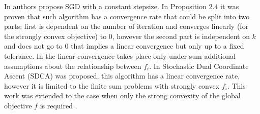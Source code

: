 In \cite{solodov1998incremental, nedic2001convergence} authors propose SGD with a constant stepsize. In Proposition $2.4$ \cite{nedic2001convergence} it was proven that such algorithm has a convergence rate that could be split into two parts: first is dependent on the number of iteration and converges linearly (for the strongly convex objective) to $0$, however the second part is independent on $k$ and does not go to $0$ that implies a linear convergence but only up to a fixed tolerance. In \cite{solodov1998incremental} the linear convergence takes place only under sum additional assumptions about the relationship between $f_i$. In \cite{shalev2013stochastic} Stochastic Dual Coordinate Ascent (SDCA) was proposed, this algorithm has a linear convergence rate, however it is limited to the finite sum problems with strongly convex $f_i$. This work was extended to the case when only the strong convexity of the global objective $f$ is required \cite{shalev2016sdca}.

